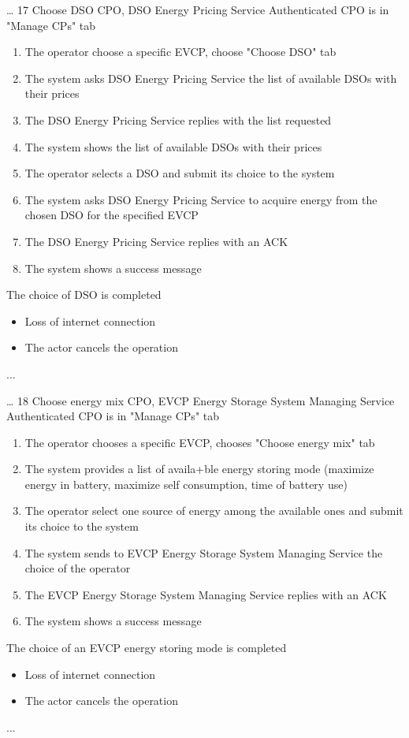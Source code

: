 \usecase
{
    \dots %
}
{17}
{Choose DSO} %
{CPO, DSO Energy Pricing Service} %
{Authenticated CPO is in "Manage CPs" tab} %
{ %
    \begin{enumerate}
        \item The operator choose a specific EVCP, choose "Choose DSO" tab
        \item The system asks DSO Energy Pricing Service the list of available DSOs with their prices
        \item The DSO Energy Pricing Service replies with the list requested
        \item The system shows the list of available DSOs with their prices
        \item The operator selects a DSO and submit its choice to the system
        \item The system asks DSO Energy Pricing Service to acquire energy from the chosen DSO for the specified EVCP
        \item The DSO Energy Pricing Service replies with an ACK
        \item The system shows a success message
    \end{enumerate}
}
{The choice of DSO is completed} %
{ %
    \begin{itemize}
        \item Loss of internet connection
        \item The actor cancels the operation
    \end{itemize}
}
{ %
    ...
}

\usecase
{
    \dots %
}
{18}
{Choose energy mix} %
{CPO, EVCP Energy Storage System Managing Service} %
{Authenticated CPO is in "Manage CPs" tab} %
{ %
    \begin{enumerate}
        \item The operator chooses a specific EVCP, chooses "Choose energy mix" tab
        \item The system provides a list of availa+ble energy storing mode (maximize energy in battery, maximize self consumption, time of battery use)
        \item The operator select one source of energy among the available ones and submit its choice to the system
        \item The system sends to EVCP Energy Storage System Managing Service the choice of the operator
        \item The EVCP Energy Storage System Managing Service replies with an ACK
        \item The system shows a success message
    \end{enumerate}
}
{The choice of an EVCP energy storing mode is completed} %
{ %
    \begin{itemize}
        \item Loss of internet connection
        \item The actor cancels the operation
    \end{itemize}
}
{ %
    ...
}


